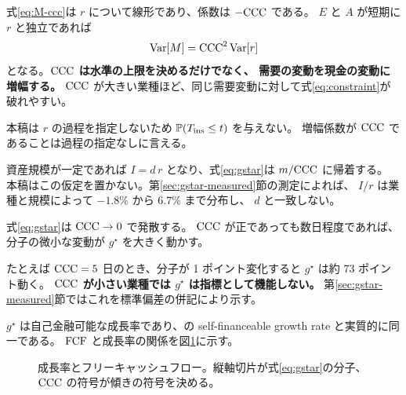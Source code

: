 \begin{remark}
\label{rem:ccc-amplifier}
式\eqref{eq:M-ccc}は $r$ について線形であり、係数は $-\mathrm{CCC}$ である。
$E$ と $A$ が短期に $r$ と独立であれば
\[
\operatorname{Var}[M] = \mathrm{CCC}^{2}\operatorname{Var}[r]
\]
となる。\textbf{$\mathrm{CCC}$ は水準の上限を決めるだけでなく、
需要の変動を現金の変動に増幅する。}
$\mathrm{CCC}$ が大きい業種ほど、同じ需要変動に対して式\eqref{eq:constraint}が破れやすい。

本稿は $r$ の過程を指定しないため $\mathbb{P}(T_{\mathrm{ins}}\leq t)$ を与えない。
増幅係数が $\mathrm{CCC}$ であることは過程の指定なしに言える。
\end{remark}

\begin{remark}
\label{rem:no-steady-investment}
資産規模が一定であれば $I = d\,r$ となり、式\eqref{eq:gstar}は $m/\mathrm{CCC}$ に帰着する。
本稿はこの仮定を置かない。第\ref{sec:gstar-measured}節の測定によれば、
$I/r$ は業種と規模によって $-1.8\%$ から $6.7\%$ まで分布し、
$d$ と一致しない。
\end{remark}

\begin{remark}
\label{rem:gstar-divergence}
式\eqref{eq:gstar}は $\mathrm{CCC}\to 0$ で発散する。
$\mathrm{CCC}$ が正であっても数日程度であれば、分子の微小な変動が
$g^\star$ を大きく動かす。

たとえば $\mathrm{CCC}=5$ 日のとき、分子が 1 ポイント変化すると
$g^\star$ は約 73 ポイント動く。
\textbf{$\mathrm{CCC}$ が小さい業種では $g^\star$ は指標として機能しない。}
第\ref{sec:gstar-measured}節ではこれを標準偏差の併記により示す。
\end{remark}

$g^\star$ は自己金融可能な成長率であり、\cite{churchill2001}の
self-financeable growth rate と実質的に同一である。
$\mathrm{FCF}$ と成長率の関係を図\ref{fig:growth}に示す。

\begin{figure}[htbp]
\centering
{}
\caption{成長率とフリーキャッシュフロー。縦軸切片が式\eqref{eq:gstar}の分子、$\mathrm{CCC}$ の符号が傾きの符号を決める。}
\label{fig:growth}
\end{figure}

